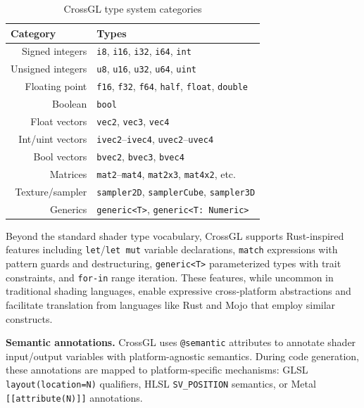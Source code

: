 \documentclass{svproc}
\begin{document}
\begin{table}
\caption{CrossGL type system categories}
\label{tab:types}
\begin{center}
\begin{tabular}{r@{\quad}l}
\hline
\multicolumn{1}{l}{\rule{0pt}{12pt}\textbf{Category}} & \textbf{Types} \\[2pt]
\hline\rule{0pt}{12pt}
Signed integers & \texttt{i8}, \texttt{i16}, \texttt{i32}, \texttt{i64}, \texttt{int} \\
Unsigned integers & \texttt{u8}, \texttt{u16}, \texttt{u32}, \texttt{u64}, \texttt{uint} \\
Floating point & \texttt{f16}, \texttt{f32}, \texttt{f64}, \texttt{half}, \texttt{float}, \texttt{double} \\
Boolean & \texttt{bool} \\
Float vectors & \texttt{vec2}, \texttt{vec3}, \texttt{vec4} \\
Int/uint vectors & \texttt{ivec2}--\texttt{ivec4}, \texttt{uvec2}--\texttt{uvec4} \\
Bool vectors & \texttt{bvec2}, \texttt{bvec3}, \texttt{bvec4} \\
Matrices & \texttt{mat2}--\texttt{mat4}, \texttt{mat2x3}, \texttt{mat4x2}, etc. \\
Texture/sampler & \texttt{sampler2D}, \texttt{samplerCube}, \texttt{sampler3D} \\
Generics & \texttt{generic\textless T\textgreater}, \texttt{generic\textless T: Numeric\textgreater} \\[2pt]
\hline
\end{tabular}
\end{center}
\end{table}

Beyond the standard shader type vocabulary, CrossGL supports Rust-inspired features including \texttt{let}/\texttt{let mut} variable declarations, \texttt{match} expressions with pattern guards and destructuring, \texttt{generic<T>} parameterized types with trait constraints, and \texttt{for-in} range iteration. These features, while uncommon in traditional shading languages, enable expressive cross-platform abstractions and facilitate translation from languages like Rust and Mojo that employ similar constructs.

\textbf{Semantic annotations.} CrossGL uses \texttt{@semantic} attributes to annotate shader input/output variables with platform-agnostic semantics. During code generation, these annotations are mapped to platform-specific mechanisms: GLSL \texttt{layout(location=N)} qualifiers, HLSL \texttt{SV\_POSITION} semantics, or Metal \texttt{[[attribute(N)]]} annotations.
\end{document}
